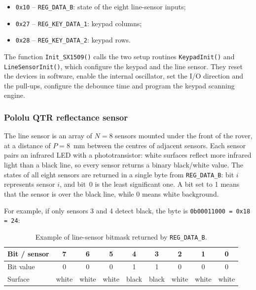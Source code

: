 \documentclass[english]{article}
\begin{document}
\smallskip
\begin{itemize}[nosep]
  \item \texttt{0x10} -- \texttt{REG\_DATA\_B}: state of the eight line-sensor inputs;
  \item \texttt{0x27} -- \texttt{REG\_KEY\_DATA\_1}: keypad columns;
  \item \texttt{0x28} -- \texttt{REG\_KEY\_DATA\_2}: keypad rows.
\end{itemize}
\smallskip

\noindent The function \texttt{Init\_SX1509()} calls the two setup routines \texttt{KeypadInit()} and
\texttt{LineSensorInit()}, which configure the keypad and the line sensor. They reset the devices in
software, enable the internal oscillator, set the I/O direction and the pull-ups, configure the debounce time
and program the keypad scanning engine.

\subsubsection{Pololu QTR reflectance sensor}

The line sensor is an array of $N=8$ sensors mounted under the front of the rover, at a distance of $P=8$~mm
between the centres of adjacent sensors. Each sensor pairs an infrared LED with a phototransistor: white
surfaces reflect more infrared light than a black line, so every sensor returns a binary black/white value.
The states of all eight sensors are returned in a single byte from \texttt{REG\_DATA\_B}: bit $i$ represents
sensor $i$, and bit~0 is the least significant one. A bit set to 1 means that the sensor is over the black
line, while 0 means white background.

\medskip
\noindent For example, if only sensors 3 and 4 detect black, the byte is \texttt{0b00011000 = 0x18 = 24}:

\begin{table}[H]
  \centering
  \small
  \begin{tabular}{lcccccccc}
    \toprule
    Bit / sensor & 7     & 6     & 5     & 4     & 3     & 2     & 1     & 0     \\
    \midrule
    Bit value    & 0     & 0     & 0     & 1     & 1     & 0     & 0     & 0     \\
    Surface      & white & white & white & black & black & white & white & white \\
    \bottomrule
  \end{tabular}
  \caption{Example of line-sensor bitmask returned by \texttt{REG\_DATA\_B}.}
  \label{tab:lab1-linesensor}
\end{table}
\end{document}
